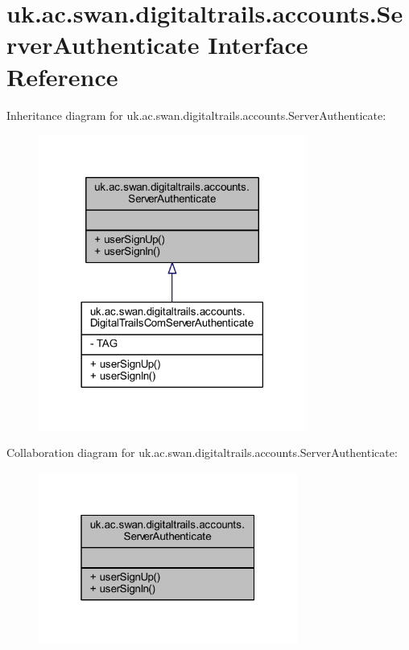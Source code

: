 \hypertarget{interfaceuk_1_1ac_1_1swan_1_1digitaltrails_1_1accounts_1_1_server_authenticate}{\section{uk.\+ac.\+swan.\+digitaltrails.\+accounts.\+Server\+Authenticate Interface Reference}
\label{interfaceuk_1_1ac_1_1swan_1_1digitaltrails_1_1accounts_1_1_server_authenticate}
}


Inheritance diagram for uk.\+ac.\+swan.\+digitaltrails.\+accounts.\+Server\+Authenticate\+:
\nopagebreak
\begin{figure}[H]
\begin{center}
\leavevmode
\includegraphics[width=249pt]{interfaceuk_1_1ac_1_1swan_1_1digitaltrails_1_1accounts_1_1_server_authenticate__inherit__graph}
\end{center}
\end{figure}


Collaboration diagram for uk.\+ac.\+swan.\+digitaltrails.\+accounts.\+Server\+Authenticate\+:
\nopagebreak
\begin{figure}[H]
\begin{center}
\leavevmode
\includegraphics[width=241pt]{interfaceuk_1_1ac_1_1swan_1_1digitaltrails_1_1accounts_1_1_server_authenticate__coll__graph}
\end{center}
\end{figure}
